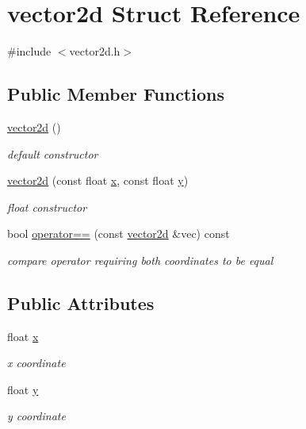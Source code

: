 \hypertarget{structvector2d}{}\section{vector2d Struct Reference}
\label{structvector2d}


{\ttfamily \#include $<$vector2d.\+h$>$}

\subsection*{Public Member Functions}
\begin{DoxyCompactItemize}
\item 
\hyperlink{structvector2d_af134871b25c59bba456d251a45fac8ab}{vector2d} ()
\begin{DoxyCompactList}\small\item\em default constructor \end{DoxyCompactList}\item 
\hyperlink{structvector2d_a7c01c4a257a4fbfe3fdbf233d60727fd}{vector2d} (const float \hyperlink{structvector2d_afc31641006a6413e6c0257ed31b98909}{x}, const float \hyperlink{structvector2d_a25beea3d3ebc2877e99dec95a889ef7a}{y})
\begin{DoxyCompactList}\small\item\em float constructor \end{DoxyCompactList}\item 
bool \hyperlink{structvector2d_a39dea488ffb98d5f1a58eff85cddecb9}{operator==} (const \hyperlink{structvector2d}{vector2d} \&vec) const
\begin{DoxyCompactList}\small\item\em compare operator requiring both coordinates to be equal \end{DoxyCompactList}\end{DoxyCompactItemize}
\subsection*{Public Attributes}
\begin{DoxyCompactItemize}
\item 
float \hyperlink{structvector2d_afc31641006a6413e6c0257ed31b98909}{x}
\begin{DoxyCompactList}\small\item\em x coordinate \end{DoxyCompactList}\item 
float \hyperlink{structvector2d_a25beea3d3ebc2877e99dec95a889ef7a}{y}
\begin{DoxyCompactList}\small\item\em y coordinate \end{DoxyCompactList}\end{DoxyCompactItemize}


